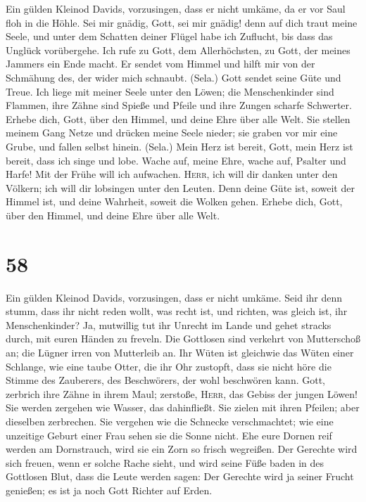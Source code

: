  Ein gülden Kleinod Davids, vorzusingen, dass er nicht
umkäme, da er vor Saul floh in die Höhle.  Sei mir gnädig,
Gott, sei mir gnädig! denn auf dich traut meine Seele, und unter dem
Schatten deiner Flügel habe ich Zuflucht, bis dass das Unglück
vorübergehe.  Ich rufe zu Gott, dem Allerhöchsten, zu
Gott, der meines Jammers ein Ende macht.  Er sendet vom
Himmel und hilft mir von der Schmähung des, der wider mich schnaubt.
(Sela.) Gott sendet seine Güte und Treue.  Ich liege mit
meiner Seele unter den Löwen; die Menschenkinder sind Flammen, ihre
Zähne sind Spieße und Pfeile und ihre Zungen scharfe Schwerter.
 Erhebe dich, Gott, über den Himmel, und deine Ehre über
alle Welt.  Sie stellen meinem Gang Netze und drücken
meine Seele nieder; sie graben vor mir eine Grube, und fallen selbst
hinein. (Sela.)  Mein Herz ist bereit, Gott, mein Herz ist
bereit, dass ich singe und lobe.  Wache auf, meine Ehre,
wache auf, Psalter und Harfe! Mit der Frühe will ich aufwachen.
 \textsc{Herr}, ich will dir danken unter den Völkern;
ich will dir lobsingen unter den Leuten.  Denn deine Güte
ist, soweit der Himmel ist, und deine Wahrheit, soweit die Wolken gehen.
 Erhebe dich, Gott, über den Himmel, und deine Ehre über
alle Welt.

\hypertarget{section-57}{%
\section{58}\label{section-57}}

 Ein gülden Kleinod Davids, vorzusingen, dass er nicht
umkäme.  Seid ihr denn stumm, dass ihr nicht reden wollt,
was recht ist, und richten, was gleich ist, ihr Menschenkinder?
 Ja, mutwillig tut ihr Unrecht im Lande und gehet stracks
durch, mit euren Händen zu freveln.  Die Gottlosen sind
verkehrt von Mutterschoß an; die Lügner irren von Mutterleib an.
 Ihr Wüten ist gleichwie das Wüten einer Schlange, wie
eine taube Otter, die ihr Ohr zustopft,  dass sie nicht
höre die Stimme des Zauberers, des Beschwörers, der wohl beschwören
kann.  Gott, zerbrich ihre Zähne in ihrem Maul; zerstoße,
\textsc{Herr}, das Gebiss der jungen Löwen!  Sie werden
zergehen wie Wasser, das dahinfließt. Sie zielen mit ihren Pfeilen; aber
dieselben zerbrechen.  Sie vergehen wie die Schnecke
verschmachtet; wie eine unzeitige Geburt einer Frau sehen sie die Sonne
nicht.  Ehe eure Dornen reif werden am Dornstrauch, wird
sie ein Zorn so frisch wegreißen.  Der Gerechte wird sich
freuen, wenn er solche Rache sieht, und wird seine Füße baden in des
Gottlosen Blut,  dass die Leute werden sagen: Der
Gerechte wird ja seiner Frucht genießen; es ist ja noch Gott Richter auf
Erden.

